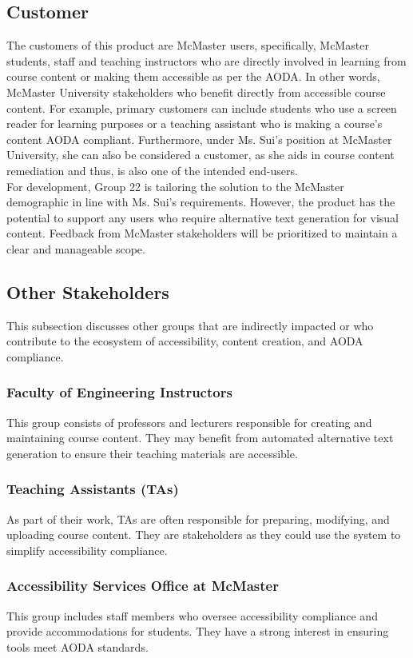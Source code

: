 \documentclass[12pt]{article}
\begin{document}
\subsection{Customer}
The customers of this product are McMaster users, specifically,
McMaster students, staff and teaching instructors who are directly
involved in learning from course content or making them accessible as per the AODA.
 In other
words, McMaster University stakeholders who benefit directly from
accessible course content. For
example, primary customers can include students who use a screen reader for
learning purposes or
a teaching assistant who is making a course's content AODA compliant.
Furthermore, under Ms. Sui's
position at McMaster University, she can also be considered a
customer, as she aids in course content remediation and thus, is also
one of the intended end-users.\\
For development, Group 22 is tailoring the solution to the
McMaster demographic in line with Ms. Sui’s requirements. However,
the product has the potential to support any users who require
alternative text generation for visual content. Feedback from
McMaster stakeholders will be prioritized to maintain a clear and
manageable scope.
\subsection{Other Stakeholders}
This subsection discusses other groups that are indirectly impacted
or who contribute to the ecosystem of accessibility, content
creation, and AODA compliance.
\subsubsection {Faculty of Engineering Instructors}
This group consists of professors and lecturers responsible for
creating and maintaining
course content. They may benefit from automated alternative text generation
to ensure their teaching materials are accessible.
\subsubsection {Teaching Assistants (TAs)}
As part of their work, TAs are often responsible for preparing,
modifying, and uploading course
content. They are stakeholders as they could use the system to
simplify accessibility compliance.
\subsubsection {Accessibility Services Office at McMaster}
This group includes staff members who oversee accessibility
compliance and provide
accommodations for students. They have a strong interest in ensuring
tools meet AODA standards.
\end{document}
